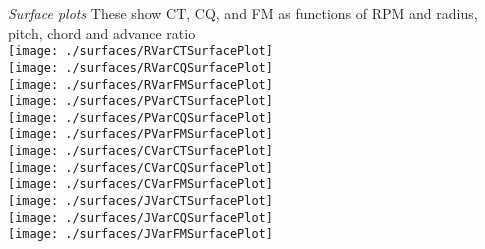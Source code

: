 \documentclass[12pt]{texmemo} %
\begin{document}
\vspace{5mm} %
\textit{Surface plots} These show CT, CQ, and FM as functions of RPM and radius, pitch, chord and advance ratio\\
\texttt{[image: ./surfaces/RVarCTSurfacePlot]}\\
\texttt{[image: ./surfaces/RVarCQSurfacePlot]}\\
\texttt{[image: ./surfaces/RVarFMSurfacePlot]}\\
\texttt{[image: ./surfaces/PVarCTSurfacePlot]}\\
\texttt{[image: ./surfaces/PVarCQSurfacePlot]}\\
\texttt{[image: ./surfaces/PVarFMSurfacePlot]}\\
\texttt{[image: ./surfaces/CVarCTSurfacePlot]}\\
\texttt{[image: ./surfaces/CVarCQSurfacePlot]}\\
\texttt{[image: ./surfaces/CVarFMSurfacePlot]}\\
\texttt{[image: ./surfaces/JVarCTSurfacePlot]}\\
\texttt{[image: ./surfaces/JVarCQSurfacePlot]}\\
\texttt{[image: ./surfaces/JVarFMSurfacePlot]}\\
\end{document}
